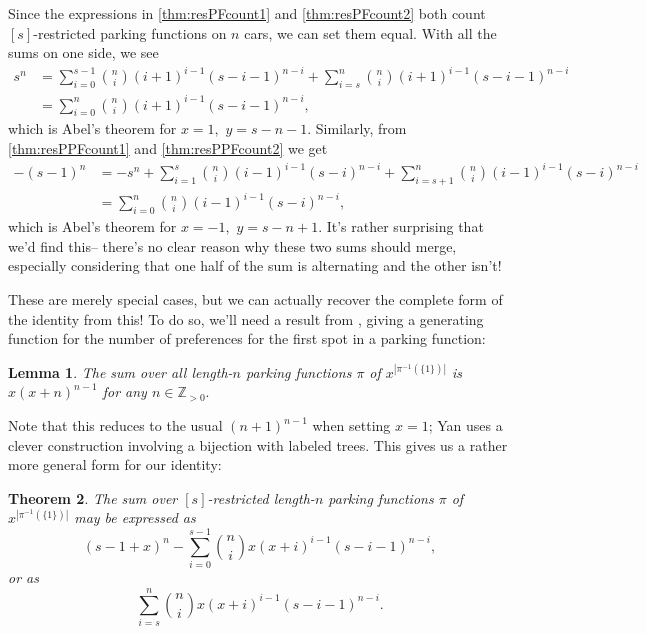 \documentclass[12 pt]{amsart}
\newtheorem{theorem}{Theorem}[section]
\newtheorem{lemma}[theorem]{Lemma}
\theoremstyle{definition} %
\theoremstyle{remark} %
\begin{document}
Since the expressions in \cref{thm:resPFcount1} and \cref{thm:resPFcount2} both count $[s]$-restricted parking functions on $n$ cars, we can set them equal. With all the sums on one side, we see
\begin{align*}
    s^{n} &= \sum_{i = 0}^{s - 1} \binom{n}{i} (i + 1)^{i - 1} (s - i - 1)^{n - i} + \sum_{i = s}^{n} \binom{n}{i} (i + 1)^{i - 1} (s - i - 1)^{n - i}\\
    &=\sum_{i = 0}^{n} \binom{n}{i} (i + 1)^{i - 1} (s - i - 1)^{n - i},
\end{align*}
which is Abel's theorem for $x=1,$ $y=s-n-1.$ Similarly, from \cref{thm:resPPFcount1} and \cref{thm:resPPFcount2} we get 
\begin{align*}
    - (s - 1)^{n} &= -s^n + \sum_{i = 1}^{s} \binom{n}{i} (i - 1)^{i - 1} (s - i)^{n - i} + \sum_{i = s + 1}^{n} \binom{n}{i} (i - 1)^{i - 1} (s - i)^{n - i}\\
    &=\sum_{i=0}^n \binom{n}{i} (i - 1)^{i - 1} (s - i)^{n - i},
\end{align*}
which is Abel's theorem for $x=-1,$ $y=s-n+1$. It's rather surprising that we'd find this-- there's no clear reason why these two sums should merge, especially considering that one half of the sum is alternating and the other isn't!

These are merely special cases, but we can actually recover the complete form of the identity from this! To do so, we'll need a result from \cite{yan-survey-2015}, giving a generating function for the number of preferences for the first spot in a parking function: %

\begin{lemma}
    The sum over all length-$n$ parking functions $\pi$ of $x^{|\pi^{-1}(\{1\})|}$ is $x(x+n)^{n-1}$ for any $n\in\mathbb{Z}_{>0}.$
\end{lemma}

Note that this reduces to the usual $(n+1)^{n-1}$ when setting $x=1$; Yan uses a clever construction involving a bijection with labeled trees. This gives us a rather more general form for our identity:

\begin{theorem}
    \label{thm:res-1s-enumerator}
    The sum over $[s]$-restricted length-$n$ parking functions $\pi$ of $x^{|\pi^{-1}(\{1\})|}$ may be expressed as
    \[(s-1+x)^{n} - \sum_{i = 0}^{s - 1} \binom{n}{i} x(x + i)^{i - 1} (s - i - 1)^{n - i},\]
    or as
    \[\sum_{i = s}^{n} \binom{n}{i} x(x + i)^{i - 1} (s - i - 1)^{n - i}.\]
\end{theorem}
\end{document}

